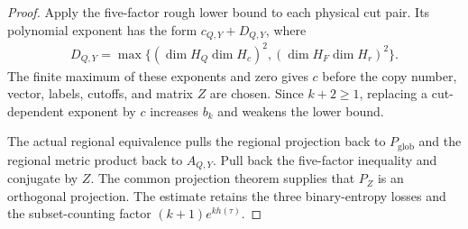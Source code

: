 \begin{proof}\leanok
  Apply the five-factor rough lower bound to each physical cut pair.
  Its polynomial exponent has the form $c_{Q,Y}+D_{Q,Y}$, where
  \begin{align*}
    D_{Q,Y}=\max\bigl\{
      (\dim H_Q\dim H_c)^2,(\dim H_F\dim H_r)^2\bigr\}.
  \end{align*}
  The finite maximum of these exponents and zero gives $c$ before the
  copy number, vector, labels, cutoffs, and matrix $Z$ are chosen.
  Since $k+2\geq1$, replacing a cut-dependent exponent by $c$ increases
  $b_k$ and weakens the lower bound.

  The actual regional equivalence pulls the regional projection back
  to $P_{\mathrm{glob}}$ and the regional metric product back to
  $A_{Q,Y}$. Pull back the five-factor inequality and conjugate by $Z$.
  The common projection theorem supplies that $P_Z$ is an orthogonal
  projection. The estimate retains the three binary-entropy losses and
  the subset-counting factor $(k+1)e^{kh(\tau)}$.
\end{proof}
